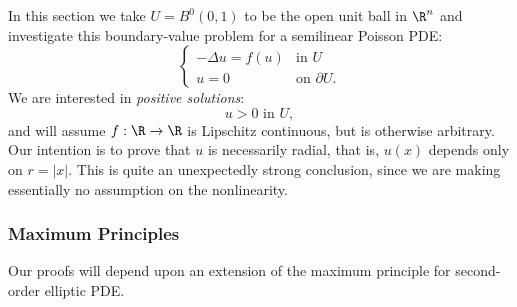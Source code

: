 In this section we take $U = B^0(0,1)$ to be the open unit ball in $\R^n$ and investigate this boundary-value problem for a semilinear Poisson PDE:
\[
\begin{cases}
-\Delta u = f(u) & \text{in } U \\
u = 0 & \text{on } \partial U.
\end{cases}
\tag{2}
\]
We are interested in \textit{positive solutions}:
\[
u > 0 \text{ in } U,
\tag{3}
\]
and will assume $f : \R \to \R$ is Lipschitz continuous, but is otherwise arbitrary. Our intention is to prove that $u$ is necessarily radial, that is, $u(x)$ depends only on $r = |x|$. This is quite an unexpectedly strong conclusion, since we are making essentially no assumption on the nonlinearity.

\subsubsection{Maximum Principles}
\label{sec:maximum-principles-radial-symmetry}

Our proofs will depend upon an extension of the maximum principle for second-order elliptic PDE.

